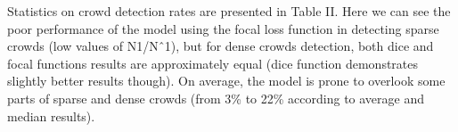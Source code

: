 \documentclass{article}
\begin{document}
\begin{multicols}{2}
\vspace{2mm}
Statistics on crowd detection rates are presented in
Table II. Here we can see the poor performance of the
model using the focal loss function in detecting sparse
crowds (low values of N1/Nˆ1), but for dense crowds
detection, both dice and focal functions results are approximately equal (dice function demonstrates slightly
better results though). On average, the model is prone to
overlook some parts of sparse and dense crowds (from 3\% to 22\%  according to average and median results).
  \end{multicols}
\end{document}
